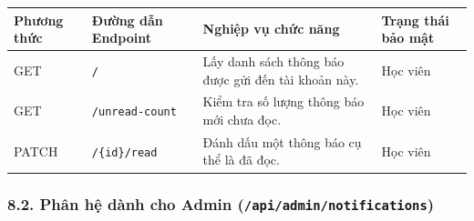 \documentclass[12pt,a4paper]{article}
\renewcommand{\_}{\BreakableUnderscore}
\begin{document}
\begin{longtable}[]{
  |>{\raggedright\arraybackslash}p{}
  |>{\raggedright\arraybackslash}p{}
  |>{\raggedright\arraybackslash}p{}
  |>{\raggedright\arraybackslash}p{}|}
\hline\rowcolor{tableHeader}
\begin{minipage}[b]{\linewidth}\raggedright
Phương thức
\end{minipage} & \begin{minipage}[b]{\linewidth}\raggedright
Đường dẫn Endpoint
\end{minipage} & \begin{minipage}[b]{\linewidth}\raggedright
Nghiệp vụ chức năng
\end{minipage} & \begin{minipage}[b]{\linewidth}\raggedright
Trạng thái bảo mật
\end{minipage} \\
\hline
\endhead
\hline
\endlastfoot
GET & \texttt{/} & Lấy danh sách thông báo được gửi đến tài khoản này. & Học viên \\
\hline
GET & \texttt{/unread-count} & Kiểm tra số lượng thông báo mới chưa đọc. & Học viên \\
\hline
PATCH & \texttt{/\{id\}/read} & Đánh dấu một thông báo cụ thể là đã đọc. & Học viên \\
\hline
\end{longtable}

\subsubsection{\texorpdfstring{8.2. Phân hệ dành cho Admin (\texttt{/api/admin/notifications})}{8.2. Phân hệ dành cho Admin (/api/admin/notifications)}}
\end{document}
